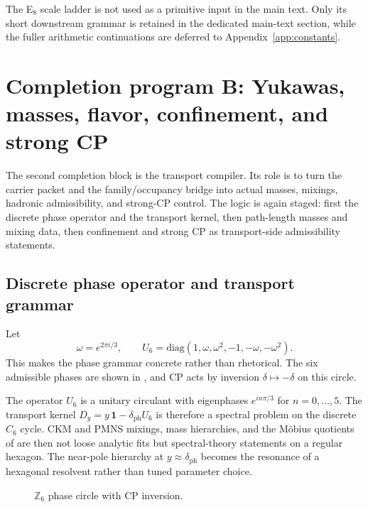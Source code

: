 The E$_8$ scale ladder is not used as a primitive input in the main text. Only its short downstream grammar is retained in the dedicated main-text section, while the fuller arithmetic continuations are deferred to Appendix~\ref{app:constants}.

\section{Completion program B: Yukawas, masses, flavor, confinement, and strong CP}

The second completion block is the transport compiler. Its role is to turn the carrier packet and the family/occupancy bridge into actual masses, mixings, hadronic admissibility, and strong-CP control. The logic is again staged: first the discrete phase operator and the transport kernel, then path-length masses and mixing data, then confinement and strong CP as transport-side admissibility statements.

\subsection{Discrete phase operator and transport grammar}

Let
\[
\omega=e^{2\pi i/3},
\qquad
U_6=\mathrm{diag}(1,\omega,\omega^2,-1,-\omega,-\omega^2).
\]
This makes the phase grammar concrete rather than rhetorical. The six admissible phases are shown in , and CP acts by inversion $\delta\mapsto-\delta$ on this circle.

\begin{remark}
The operator $U_6$ is a unitary circulant with eigenphases $e^{in\pi/3}$ for $n=0,\dots,5$. The transport kernel $D_y=y\,\mathbf 1-\delta_{\mathrm{ph}}U_6$ is therefore a spectral problem on the discrete $C_6$ cycle. CKM and PMNS mixings, mass hierarchies, and the Möbius quotients of  are then not loose analytic fits but spectral-theory statements on a regular hexagon. The near-pole hierarchy at $y\approx\delta_{\mathrm{ph}}$ becomes the resonance of a hexagonal resolvent rather than tuned parameter choice.
\end{remark}

\begin{figure}[t]
\centering
{}
\caption{$\mathbb Z_6$ phase circle with CP inversion.}
\label{fig:z6-circle}
\end{figure}

